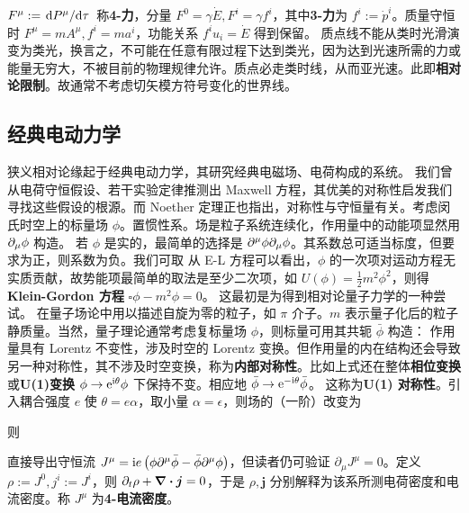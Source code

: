 $F^\mu:=\dv*{P^\mu}{\tau}$ 称\textbf{4-力}，分量 $F^0=\gamma\dot{E},F^i=\gamma f^i$，其中\textbf{3-力}为 $f^i:=\dot{p}^i$。质量守恒时 $F^\mu=m A^\mu,f^i=m a^i$，功能关系 $f^i u_i=\dot{E}$ 得到保留。
质点线不能从类时光滑演变为类光，换言之，不可能在任意有限过程下达到类光，因为达到光速所需的力或能量无穷大，不被目前的物理规律允许。质点必走类时线，从而亚光速。此即\textbf{相对论限制}。故通常不考虑切矢模方符号变化的世界线。

\subsection{经典电动力学}

狭义相对论缘起于经典电动力学，其研究经典电磁场、电荷构成的系统。
我们曾从电荷守恒假设、若干实验定律推测出 Maxwell 方程，其优美的对称性启发我们寻找这些假设的根源。而 Noether 定理正也指出，对称性与守恒量有关。考虑闵氏时空上的标量场 $\phi$。置惯性系。场是粒子系统连续化，作用量中的动能项显然用 $\partial_\mu\phi$ 构造。
若 $\phi$ 是实的，最简单的选择是 $\partial^\mu\phi\partial_\mu\phi$。其系数总可适当标度，但要求为正，则系数为负。我们可取
从 E-L 方程可以看出，$\phi$ 的一次项对运动方程无实质贡献，故势能项最简单的取法是至少二次项，如 $U(\phi)=\frac 12 m^2\phi^2$，则得\textbf{Klein-Gordon 方程} $\square\phi-m^2\phi=0$。
这最初是为得到相对论量子力学的一种尝试。
在量子场论中用以描述自旋为零的粒子，如 $\pi$ 介子。$m$ 表示量子化后的粒子静质量。当然，量子理论通常考虑复标量场 $\phi$，则标量可用其共轭 $\bar\phi$ 构造：
作用量具有 Lorentz 不变性，涉及时空的 Lorentz 变换。但作用量的内在结构还会导致另一种对称性，其不涉及时空变换，称为\textbf{内部对称性}。比如上式还在整体\textbf{相位变换}或\textbf{U(1)变换} $\phi \to \mathrm{e}^{\mathrm{i} \theta} \phi$ 下保持不变。相应地 $\bar{\phi} \to \mathrm{e}^{-\mathrm{i} \theta} \bar{\phi}$。
这称为\textbf{U(1) 对称性}。引入耦合强度 $e$ 使 $\theta=e\alpha$，取小量 $\alpha=\epsilon$，则场的（一阶）改变为


则

直接导出守恒流
$J^\mu=\mathrm{i} e\left(\phi\partial^\mu \bar{\phi}-\bar{\phi} \partial^\mu \phi \right)$，但读者仍可验证 $\partial_\mu J^\mu=0$。定义 $\rho:=J^0,j^i:=J^i$，则 $\partial_t\rho+\div\vb* j=0$，于是 $\rho,\bm j$ 分别解释为该系所测电荷密度和电流密度。称 $J^\mu$ 为\textbf{4-电流密度}。

